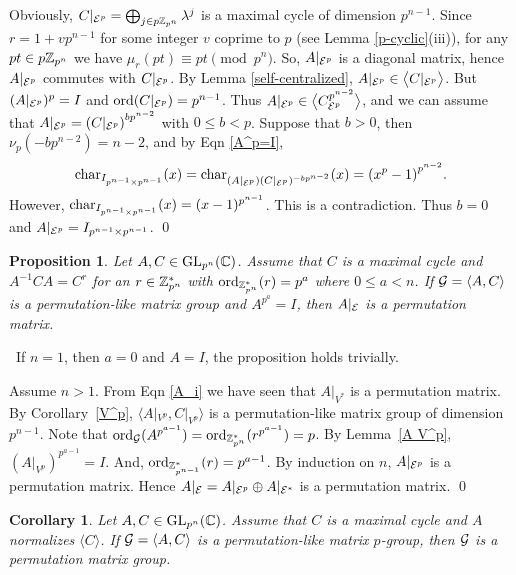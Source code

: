 \documentclass{article}
\newtheorem{corollary}[theorem]{Corollary}
\newtheorem{proposition}[theorem]{Proposition}
\numberwithin{equation}{section}
\def\pf{\noindent{\bf Proof.}~}
\begin{document}
Obviously, $C|_{{\cal E}^p}=\bigoplus_{j\in{p{\Bbb Z}_{p^n}}}\lambda^{j}$
is a maximal cycle of dimension $p^{n-1}$.
Since $r=1+vp^{n-1}$ for some integer $v$ coprime to $p$
(see Lemma \ref{p-cyclic}(iii)),
for any $pt\in p{\Bbb Z}_{p^n}$ we have $\mu_r(pt)\equiv pt\pmod{p^n}$.
So, $A|_{{\cal E}^p}$ is a diagonal matrix, hence
$A|_{{\cal E}^p}$ commutes with $C|_{{\cal E}^p}$.
By Lemma \ref{self-centralized},
$A|_{{\cal E}^p}\in\big\langle C|_{{\cal E}^p}\big\rangle$.
But $(A|_{{\cal E}^p})^p=I$ and ${\rm ord}(C|_{{\cal E}^p})=p^{n-1}$.
Thus $A|_{{\cal E}^p}\in\big\langle C_{{\cal E}^p}^{p^{n-2}}\big\rangle$, 
and we can assume that
$A|_{{\cal E}^p}={(C|_{{\cal E}^p})}^{b p^{n-2}}$
with $0\le b<p$. Suppose that $b>0$, then
$\nu_p(-b p^{n-2})=n-2$, and by Eqn \eqref{A^p=I},
$$
{\rm char}_{I_{p^{n-1}\times p^{n-1}}}(x)
={\rm char}_{(A|_{{\cal E}^p})(C|_{{\cal E}^p})^{-b p^{n-2}}}(x)
={(x^p-1)}^{p^{n-2}}.
$$
However, ${\rm char}_{I_{p^{n-1}\times p^{n-1}}}(x)=(x-1)^{p^{n-1}}$.
This is a contradiction. Thus
$b=0$ and $A|_{{\cal E}^p}=I_{p^{n-1}\times p^{n-1}}$.
\qed


\begin{proposition}\label{p-group}
Let $A,C\in{\rm GL}_{p^n}({\Bbb C})$.
Assume that $C$ is a maximal cycle and
$A^{-1}CA=C^r$ for an $r\in{\Bbb Z}_{p^n}^*$
with ${\rm ord}_{{\Bbb Z}_{p^n}^*}(r)=p^a$ where $0\le a<n$.
If ${\cal G}=\langle A, C\rangle$ is a permutation-like matrix group and $A^{p^a}=I$,
then $A|_{\cal E}$ is a permutation matrix.
\end{proposition}

\pf If $n=1$, then $a=0$ and $A=I$, the proposition holds trivially.

Assume $n>1$.
From Eqn \eqref{A_i} we have seen that $A|_{V^*}$ is a permutation matrix.
By Corollary~\ref{V^p}, $\langle A|_{V^p}, C|_{V^p}\rangle$ is a permutation-like
matrix group of dimension $p^{n-1}$. Note that
${\rm ord}_{\cal G}(A^{p^{a-1}})
 ={\rm ord}_{{\Bbb Z}_{p^{n}}^*}(r^{p^{a-1}})=p$.
By Lemma~\ref{A V^p}, $(A|_{V^p})^{p^{a-1}}=I$.
And, ${\rm ord}_{{\Bbb Z}_{p^{n-1}}^*}(r)=p^{a-1}$.
By induction on $n$, $A|_{{\cal E}^p}$ is a permutation matrix.
Hence $A|_{\cal E}=A|_{{\cal E}^p}\oplus A|_{{\cal E}^*}$
is a permutation matrix.
 \qed

\begin{corollary}\label{p group}
Let $A,C\in{\rm GL}_{p^n}({\Bbb C})$.
Assume that $C$ is a maximal cycle and $A$ normalizes $\langle C\rangle$.
If ${\cal G}=\langle A, C\rangle$ is a permutation-like matrix $p$-group,
then ${\cal G}$ is a permutation matrix group.
\end{corollary}
\end{document}
